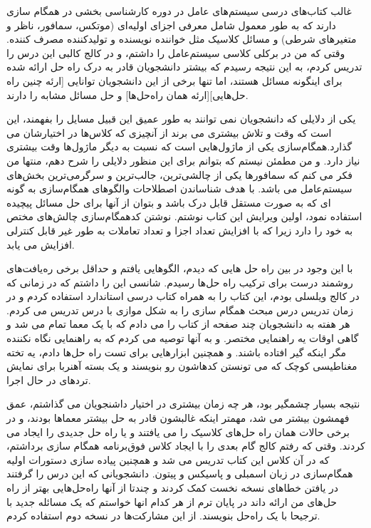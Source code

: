 \documentclass{book}
\begin{document}
غالب کتاب‌های درسی سیستم‌های عامل در دوره کارشناسی بخشی در همگام سازی دارند که به طور معمول شامل معرفی اجزای اولیه‌ای (موتکس، سمافور، ناظر و متغیر‌های شرطی) و مسائل کلاسیک مثل خواننده نویسنده و تولیدکننده مصرف کننده.
وقتی که من در برکلی کلاسی سیستم‌عامل را داشتم، و در کالج کالبی این درس را تدریس کردم، به این نتیجه رسیدم که بیشتر دانشجویان قادر به درک راه حل ارائه شده برای اینگونه مسائل هستند، اما تنها برخی از این دانشجویان توانایی [ارئه چنین راه حل‌هایی][ارئه همان راه‌حل‌ها] و  حل مسائل مشابه را دارند.

یکی از دلایلی که دانشجویان نمی توانند به طور عمیق این قبیل مسایل را بفهمند، این است که وقت و تلاش بیشتری می برند از آنچیزی که کلاس‌ها در اختیارشان می گذارد.همگام‌سازی یکی از ماژول‌هایی است که نسبت به دیگر ماژول‌ها وقت بیشتری نیاز دارد. و من مطمئن نیستم که بتوانم برای این منظور دلایلی را شرح دهم، منتها من فکر می کنم که سمافور‌ها یکی از چالشی‌ترین، جالب‌ترین و سرگرمی‌ترین بخش‌های سیستم‌عامل می باشد.
با هدف شناساندن  اصطلاحات والگوهای همگام‌سازی به گونه ای که به صورت مستقل قابل درک باشد و بتوان از آنها برای حل مسائل پیچیده استفاده نمود، اولین ویرایش این کتاب نوشتم.
نوشتن کدهمگام‌سازی چالش‌های مختص به خود را دارد زیرا که با افزایش تعداد اجزا و تعداد تعاملات به طور غیر قابل کنترلی افزایش می یابد.


با این وجود در بین راه حل هایی که دیدم، الگوهایی یافتم و حداقل برخی  ره‌یافت‌های روشمند درست برای ترکیب راه حل‌ها رسیدم.
شانسی این را داشتم که در زمانی که در کالج ویلسلی بودم، این کتاب را به همراه کتاب درسی استاندارد استفاده کردم و در زمان تدریس درس مبحث همگام سازی را به شکل موازی با درس تدریس می کردم. هر هفته به دانشجویان چند صفحه از کتاب را می دادم که با یک معما تمام می شد و گاهی اوقات یه راهنمایی مختصر. و به آنها توصیه می کردم که به راهنمایی نگاه نکننده مگر اینکه گیر افتاده باشند.
و همچنین ابزارهایی برای تست راه حل‌ها دادم، یه تخته مغناطیسی کوچک که می تونستن کدهاشون رو بنویسند و یک بسته آهنربا برای نمایش تردهای در حال اجرا.

نتیجه بسیار چشمگیر بود، هر چه زمان بیشتری در اختیار داشنجویان می گذاشتم، عمق فهمشون بیشتر می شد، مهمتر اینکه غالبشون قادر به حل بیشتر معماها بودند، و در برخی حالات همان راه حل‌های کلاسیک را می یافتند و یا راه حل جدیدی را ایجاد می کردند.
وقتی که رفتم کالج گام بعدی را با ایجاد کلاس فوق‌برنامه همگام سازی برداشتم، که در آن کلاس این کتاب تدریس می شد و همچنین پیاده سازی دستورات اولیه همگام‌سازی در زبان اسمبلی  و پاسیکس و پیتون.
دانشجویانی که این درس را گرفتند در یافتن خطاهای نسخه نخست کمک کردند و چندتا از آنها راه‌حل‌هایی بهتر از راه حل‌های من ارائه داند در پایان ترم از هر کدام انها خواستم که یک مسائله جدید با ترجیحا با یک راه‌حل بنویسند. از این مشارکت‌ها در نسخه دوم استفاده کردم.
\end{document}

